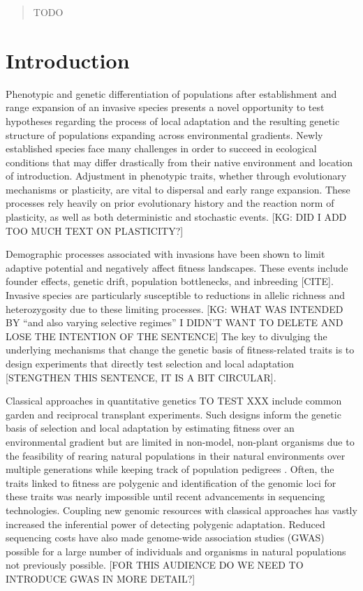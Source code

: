 \documentclass[smallextended]{svjour3}
\begin{document}
\begin{abstract}
TODO

\keywords{}

\end{abstract}


\thispagestyle{empty}

\linenumbers%

\section*{Introduction}


Phenotypic and genetic differentiation of populations after establishment and
range expansion of an invasive species presents a novel opportunity to test
hypotheses regarding the process of local adaptation and the resulting genetic
structure of populations expanding across environmental gradients. Newly
established species face many challenges in order to succeed in
ecological conditions that may differ drastically from their native environment
and location of introduction. Adjustment in phenotypic traits, whether through
evolutionary mechanisms or plasticity, are vital to dispersal and early range
expansion. These processes rely heavily on prior evolutionary history and the
reaction norm of plasticity, as well as both deterministic and stochastic
events. [KG: DID I ADD TOO MUCH TEXT ON PLASTICITY?]

Demographic processes associated with invasions have been shown to limit
adaptive potential and negatively affect fitness landscapes. These events
include founder effects, genetic drift, population bottlenecks, and inbreeding
[CITE].  Invasive species are particularly susceptible to reductions in allelic
richness and heterozygosity due to these limiting processes. [KG: WHAT WAS
INTENDED BY ``and also varying selective regimes'' I DIDN'T WANT TO DELETE AND
LOSE THE INTENTION OF THE SENTENCE]  The key to divulging the underlying
mechanisms that change the genetic basis of fitness-related traits is to design
experiments that directly test selection and local adaptation [STENGTHEN THIS
SENTENCE, IT IS A BIT CIRCULAR].

Classical approaches in quantitative genetics TO TEST XXX include common garden
and reciprocal transplant experiments. Such designs inform the genetic basis of
selection and local adaptation by estimating fitness over an environmental
gradient but are limited in non-model, non-plant organisms due to the
feasibility of rearing natural populations in their natural environments over
multiple generations while keeping track of population pedigrees
\citep{Savolainen:2013df, Hirschhorn:2005cka}. Often, the traits linked to
fitness are
polygenic and identification of the genomic loci for these traits was nearly
impossible until recent advancements in sequencing technologies. Coupling new
genomic resources with classical approaches has vastly increased the
inferential
power of detecting polygenic adaptation. Reduced sequencing costs have also
made
genome-wide association studies (GWAS) possible for a large number of
individuals and organisms in natural populations not previously possible. [FOR
THIS AUDIENCE DO WE NEED TO INTRODUCE GWAS IN MORE DETAIL?]
\end{document}
